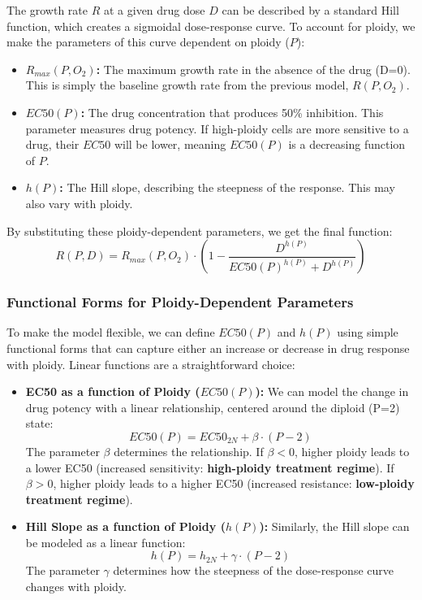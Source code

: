 \documentclass{article}
\begin{document}
The growth rate $R$ at a given drug dose $D$ can be described by a standard Hill function, which creates a sigmoidal dose-response curve. To account for ploidy, we make the parameters of this curve dependent on ploidy ($P$):
\begin{itemize}
    \item \textbf{$R_{max}(P, O_2)$:} The maximum growth rate in the absence of the drug (D=0). This is simply the baseline growth rate from the previous model, $R(P, O_2)$.
    \item \textbf{$EC50(P)$:} The drug concentration that produces 50\% inhibition. This parameter measures drug potency. If high-ploidy cells are more sensitive to a drug, their $EC50$ will be lower, meaning $EC50(P)$ is a decreasing function of $P$.
    \item \textbf{$h(P)$:} The Hill slope, describing the steepness of the response. This may also vary with ploidy.
\end{itemize}

By substituting these ploidy-dependent parameters, we get the final function:
\color{blue}
$$
R(P, D) = R_{max}(P, O_2) \cdot \left(1 - \frac{D^{h(P)}}{EC50(P)^{h(P)} + D^{h(P)}}\right)
$$
\color{black}

\subsubsection*{Functional Forms for Ploidy-Dependent Parameters}
To make the model flexible, we can define $EC50(P)$ and $h(P)$ using simple functional forms that can capture either an increase or decrease in drug response with ploidy. Linear functions are a straightforward choice:

\begin{itemize}
    \item \textbf{EC50 as a function of Ploidy ($EC50(P)$):} We can model the change in drug potency with a linear relationship, centered around the diploid (P=2) state:
    $$ EC50(P) = EC50_{2N} + \beta \cdot (P - 2) $$
    \color{blue}
    The parameter $\beta$ determines the relationship. If $\beta < 0$, higher ploidy leads to a lower EC50 (increased sensitivity: \textbf{ high-ploidy treatment regime}). If $\beta > 0$, higher ploidy leads to a higher EC50 (increased resistance:  \textbf{low-ploidy treatment regime}).
    \color{black}
    \item \textbf{Hill Slope as a function of Ploidy ($h(P)$):} Similarly, the Hill slope can be modeled as a linear function:
    $$ h(P) = h_{2N} + \gamma \cdot (P - 2) $$
    \color{blue}
    The parameter $\gamma$ determines how the steepness of the dose-response curve changes with ploidy.
    \color{black}
\end{itemize}
\end{document}

